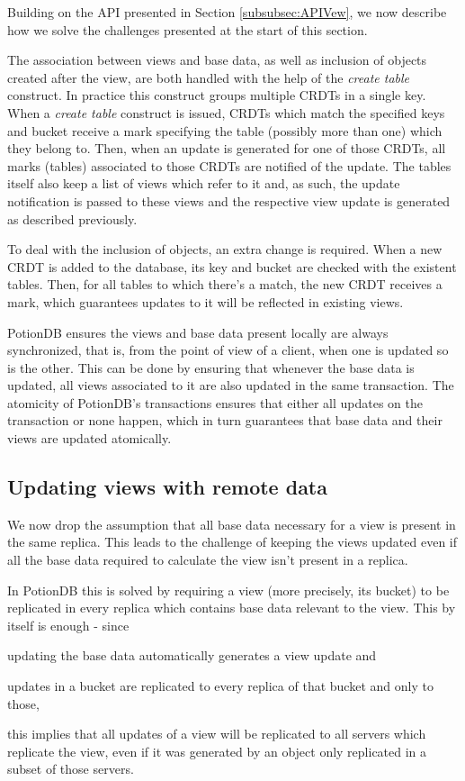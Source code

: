 \documentclass{vldb}
\begin{document}
Building on the API presented in Section \ref{subsubsec:APIVew}, we now describe how we solve the challenges presented at the start of this section.

The association between views and base data, as well as inclusion of objects created after the view, are both handled with the help of the \emph{create table} construct.
In practice this construct groups multiple CRDTs in a single key.
When a \emph{create table} construct is issued, CRDTs which match the specified keys and bucket receive a mark specifying the table (possibly more than one) which they belong to.
Then, when an update is generated for one of those CRDTs, all marks (tables) associated to those CRDTs are notified of the update.
The tables itself also keep a list of views which refer to it and, as such, the update notification is passed to these views and the respective view update is generated as described previously.

To deal with the inclusion of objects, an extra change is required.
When a new CRDT is added to the database, its key and bucket are checked with the existent tables.
Then, for all tables to which there's a match, the new CRDT receives a mark, which guarantees updates to it will be reflected in existing views.

PotionDB ensures the views and base data present locally are always synchronized, that is, from the point of view of a client, when one is updated so is the other.
This can be done by ensuring that whenever the base data is updated, all views associated to it are also updated in the same transaction.
The atomicity of PotionDB's transactions ensures that either all updates on the transaction or none happen, which in turn guarantees that base data and their views are updated atomically.

\subsection{Updating views with remote data}

We now drop the assumption that all base data necessary for a view is present in the same replica.
This leads to the challenge of keeping the views updated even if all the base data required to calculate the view isn't present in a replica.

In PotionDB this is solved by requiring a view (more precisely, its bucket) to be replicated in every replica which contains base data relevant to the view.
This by itself is enough - since 
\begin{enumerate*}[label=(\roman*)]
\item updating the base data automatically generates a view update and
\item updates in a bucket are replicated to every replica of that bucket and only to those,
\end{enumerate*}
this implies that all updates of a view will be replicated to all servers which replicate the view, even if it was generated by an object only replicated in a subset of those servers.
\end{document}
